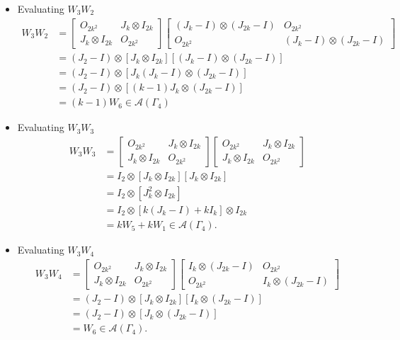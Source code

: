 \begin{itemize}
    \item Evaluating \( W_3 W_2 \)
    \begin{align*}
        W_3W_2 
        &=\begin{bmatrix}
            O_{2k^2} & J_k \otimes I_{2k} \\
            J_k \otimes I_{2k} & O_{2k^2}
        \end{bmatrix}\begin{bmatrix}
            (J_k -I) \otimes (J_{2k} -I) & O_{2k^2}\\
            O_{2k^2} & (J_k -I) \otimes (J_{2k} -I)
        \end{bmatrix} \\
        &= (J_2-I)\otimes [J_k \otimes I_{2k}][(J_k -I) \otimes (J_{2k} -I)]\\
        &= (J_2-I)\otimes [J_k(J_k -I) \otimes (J_{2k} -I)]\\
        &= (J_2-I) \otimes [(k-1)J_k \otimes(J_{2k} -I)] \\
        &= (k-1)W_6\in\mathcal{A}(\Gamma_4)
    \end{align*}
    
    \item Evaluating \( W_3 W_3 \)
    \begin{align*}
        W_3W_3
        &=\begin{bmatrix}
            O_{2k^2} & J_k \otimes I_{2k} \\
            J_k \otimes I_{2k} & O_{2k^2}
        \end{bmatrix}\begin{bmatrix}
            O_{2k^2} & J_k \otimes I_{2k} \\
            J_k \otimes I_{2k} & O_{2k^2}
        \end{bmatrix} \\
        &= I_2\otimes [J_k \otimes I_{2k}][J_k \otimes I_{2k}]\\
        &= I_2\otimes [J_k^2 \otimes I_{2k}]\\
        &= I_2 \otimes [k(J_k-I) + kI_k]\otimes I_{2k}\\
        &= kW_5 + kW_1\in\mathcal{A}(\Gamma_4).
    \end{align*}
    
    \item Evaluating \( W_3 W_4 \)
    \begin{align*}
        W_3W_4
        &=\begin{bmatrix}
            O_{2k^2} & J_k \otimes I_{2k} \\
            J_k \otimes I_{2k} & O_{2k^2}
        \end{bmatrix}\begin{bmatrix}
            I_{k} \otimes (J_{2k} - I) & O_{2k^2} \\
            O_{2k^2} & I_{k} \otimes (J_{2k} - I)
        \end{bmatrix}\\
        &= (J_2-I)\otimes [J_k \otimes I_{2k}][I_{k} \otimes (J_{2k} - I)]\\
        &= (J_2-I)\otimes [J_k \otimes (J_{2k} - I)]\\
        &=W_6\in\mathcal{A}(\Gamma_4).
    \end{align*}
    

\end{itemize}
